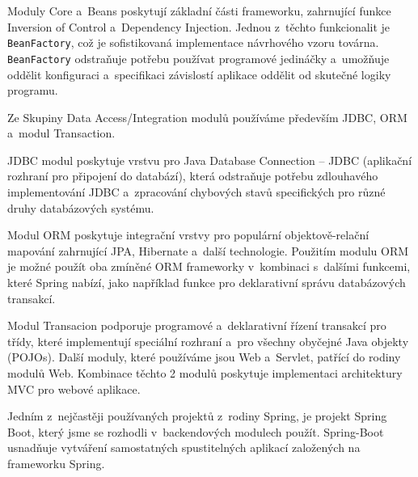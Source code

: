\documentclass[twoside, 12pt]{article}
\begin{document}
{%
Moduly Core a~Beans poskytují základní části frameworku,
zahrnující funkce Inversion of Control a~Dependency Injection.
Jednou z~těchto funkcionalit je \texttt{BeanFactory},
což je sofistikovaná implementace návrhového vzoru továrna.
\texttt{BeanFactory} odstraňuje potřebu používat programové jedináčky
a~umožňuje oddělit konfiguraci a~specifikaci závislostí aplikace oddělit od skutečné logiky programu.


Ze Skupiny Data Access/Integration modulů používáme především JDBC, ORM
a~modul Transaction.

JDBC modul poskytuje vrstvu pro Java Database Connection
-- JDBC (aplikační rozhraní pro připojení do databází),
která odstraňuje potřebu zdlouhavého implementování JDBC a~zpracování chybových stavů specifických pro různé druhy databázových systému.

Modul ORM poskytuje integrační vrstvy pro populární objektově-relační mapování
zahrnující JPA, Hibernate a~další technologie.
Použitím modulu ORM je možné použít oba zmíněné ORM frameworky
v~kombinaci s~dalšími funkcemi, které Spring nabízí,
jako například funkce pro deklarativní správu databázových transakcí.

Modul Transacion podporuje programové a~deklarativní řízení
transakcí pro třídy, které implementují speciální rozhraní
a~pro všechny obyčejné Java objekty (POJOs).
Další moduly, které používáme jsou Web a~Servlet, patřící do rodiny modulů Web.
Kombinace těchto 2 modulů poskytuje implementaci architektury MVC
pro webové aplikace.
\cite{springFrameworkDocs}

Jedním z~nejčastěji používaných projektů z~rodiny Spring,
je projekt Spring Boot, který jsme se rozhodli v~backendových modulech použít.
Spring-Boot usnadňuje vytváření samostatných spustitelných aplikací
založených na frameworku Spring.
\cite{springbootDocs}


}
\end{document}
